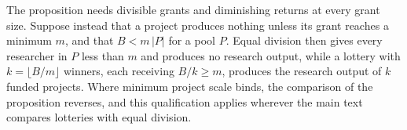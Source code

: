 \begin{remark}
The proposition needs divisible grants and diminishing returns at every grant size. Suppose instead that a project produces nothing unless its grant reaches a minimum $m$, and that $B < m\,|P|$ for a pool $P$. Equal division then gives every researcher in $P$ less than $m$ and produces no research output, while a lottery with $k = \lfloor B/m \rfloor$ winners, each receiving $B/k \geq m$, produces the research output of $k$ funded projects. Where minimum project scale binds, the comparison of the proposition reverses, and this qualification applies wherever the main text compares lotteries with equal division.
\end{remark}

